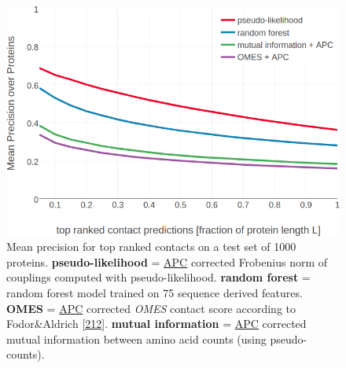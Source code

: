 \documentclass[11pt,a4paper,twoside]{book}
\theoremstyle{definition}
\theoremstyle{definition}
\theoremstyle{remark}
\begin{document}
\begin{figure}
\includegraphics[width=1\linewidth]{img/random_forest_contact_prior/precision_vs_rank_notitle} \caption{Mean precision for top ranked contacts on a
test set of 1000 proteins. \textbf{pseudo-likelihood} =
\protect\hyperlink{abbrev}{APC} corrected Frobenius norm of couplings
computed with pseudo-likelihood. \textbf{random forest} = random forest
model trained on 75 sequence derived features. \textbf{OMES} =
\protect\hyperlink{abbrev}{APC} corrected \emph{OMES} contact score
according to Fodor\&Aldrich
{[}\protect\hyperlink{ref-Fodor2004a}{212}{]}. \textbf{mutual
information} = \protect\hyperlink{abbrev}{APC} corrected mutual
information between amino acid counts (using pseudo-counts).}\label{fig:performance-rf}
\end{figure}
\end{document}
